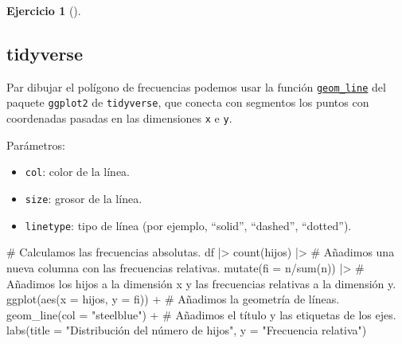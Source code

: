 \documentclass[
  spanish,
  a4paper,
]{scrreport}
\newenvironment{Shaded}{\begin{snugshade}}{\end{snugshade}}
\newcommand{\AttributeTok}[1]{\textcolor[rgb]{0.40,0.45,0.13}{#1}}
\newcommand{\CommentTok}[1]{\textcolor[rgb]{0.37,0.37,0.37}{#1}}
\newcommand{\FunctionTok}[1]{\textcolor[rgb]{0.28,0.35,0.67}{#1}}
\newcommand{\NormalTok}[1]{\textcolor[rgb]{0.00,0.23,0.31}{#1}}
\newcommand{\SpecialCharTok}[1]{\textcolor[rgb]{0.37,0.37,0.37}{#1}}
\newcommand{\StringTok}[1]{\textcolor[rgb]{0.13,0.47,0.30}{#1}}
\providecommand{\tightlist}{%
  \setlength{\itemsep}{0pt}\setlength{\parskip}{0pt}}
\theoremstyle{definition}
\newtheorem{exercise}{Ejercicio}[chapter]
\theoremstyle{remark}
\begin{document}
\begin{exercise}[]
\begin{enumerate}
\begin{tcolorbox}
  \section{tidyverse}

  Par dibujar el polígono de frecuencias podemos usar la función
  \href{https://aprendeconalf.es/manual-r/07-graficos.html\#diagramas-de-lineas}{\texttt{geom\_line}}
  del paquete \texttt{ggplot2} de \texttt{tidyverse}, que conecta con
  segmentos los puntos con coordenadas pasadas en las dimensiones
  \texttt{x} e \texttt{y}.

  Parámetros:

  \begin{itemize}
  \tightlist
  \item
    \texttt{col}: color de la línea.
  \item
    \texttt{size}: grosor de la línea.
  \item
    \texttt{linetype}: tipo de línea (por ejemplo, ``solid'',
    ``dashed'', ``dotted'').
  \end{itemize}

\begin{Shaded}
\begin{Highlighting}[]
\CommentTok{\# Calculamos las frecuencias absolutas.}
\NormalTok{df }\SpecialCharTok{|\textgreater{}} \FunctionTok{count}\NormalTok{(hijos) }\SpecialCharTok{|\textgreater{}} 
    \CommentTok{\# Añadimos una nueva columna con las frecuencias relativas.}
    \FunctionTok{mutate}\NormalTok{(}\AttributeTok{fi =}\NormalTok{ n}\SpecialCharTok{/}\FunctionTok{sum}\NormalTok{(n)) }\SpecialCharTok{|\textgreater{}}
    \CommentTok{\# Añadimos los hijos a la dimensión x y las frecuencias relativas a la dimensión y.}
    \FunctionTok{ggplot}\NormalTok{(}\FunctionTok{aes}\NormalTok{(}\AttributeTok{x =}\NormalTok{ hijos, }\AttributeTok{y =}\NormalTok{ fi)) }\SpecialCharTok{+}
    \CommentTok{\# Añadimos la geometría de líneas.}
    \FunctionTok{geom\_line}\NormalTok{(}\AttributeTok{col =} \StringTok{"steelblue"}\NormalTok{) }\SpecialCharTok{+}
    \CommentTok{\# Añadimos el título y las etiquetas de los ejes.}
    \FunctionTok{labs}\NormalTok{(}\AttributeTok{title =} \StringTok{"Distribución del número de hijos"}\NormalTok{, }\AttributeTok{y =} \StringTok{"Frecuencia relativa"}\NormalTok{)}
\end{Highlighting}
\end{Shaded}


\end{tcolorbox}
\end{enumerate}
\end{exercise}
\end{document}
